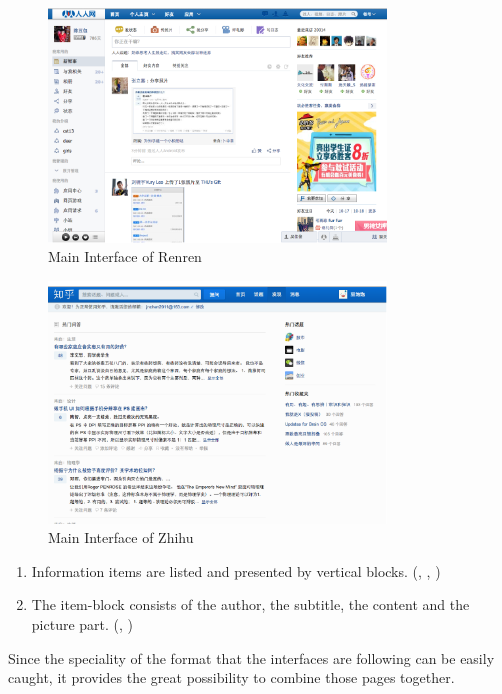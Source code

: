 \begin{enumerate}
\begin{figure}[H]
  \centering
  \includegraphics[width=0.8\textwidth]{img/renren.png}
  \caption{Main Interface of Renren\label{fig:renren}}
\end{figure}

\begin{figure}[H]
  \centering
  \includegraphics[width=0.8\textwidth]{img/zhihu.png}
  \caption{Main Interface of Zhihu\label{fig:zhihu}}
\end{figure}


\begin{enumerate}
  \item  Information items are listed and presented by vertical blocks. (, , )

  \item The item-block consists of the author, the subtitle, the content and the picture part. (, )
\end{enumerate}

    Since the speciality of the format
    that the interfaces are following can be easily caught,
    it provides the great possibility to combine those pages together.

\end{enumerate}

